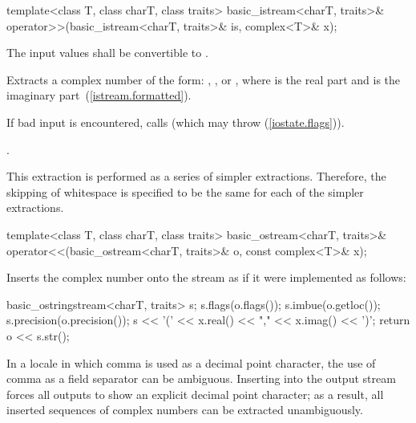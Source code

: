 %
\begin{itemdecl}
template<class T, class charT, class traits>
basic_istream<charT, traits>&
operator>>(basic_istream<charT, traits>& is, complex<T>& x);
\end{itemdecl}

\begin{itemdescr}
\pnum
\requires
The input values shall be convertible to
.

\pnum
\effects
Extracts a complex number  of the form:
,
,
or
,
where
is the real part and
is the imaginary part~(\ref{istream.formatted}).

\pnum
If bad input is encountered, calls
(which may throw
 (\ref{iostate.flags})).

\pnum
\returns
{}.

\pnum
\remarks
This extraction is performed as a series of simpler
extractions.
Therefore, the skipping of whitespace is specified to be
the same for each of the simpler extractions.
\end{itemdescr}

%
\begin{itemdecl}
template<class T, class charT, class traits>
basic_ostream<charT, traits>&
operator<<(basic_ostream<charT, traits>& o, const complex<T>& x);
\end{itemdecl}

\begin{itemdescr}
\pnum
\effects
Inserts the complex number 
onto the stream  as if it were implemented as follows:

\begin{codeblock}
basic_ostringstream<charT, traits> s;
s.flags(o.flags());
s.imbue(o.getloc());
s.precision(o.precision());
s << '(' << x.real() << "," << x.imag() << ')';
return o << s.str();
\end{codeblock}

\pnum
\begin{note}
In a locale in which comma is used as a decimal point character, the
use of comma as a field separator can be ambiguous. Inserting
 into the output stream forces all outputs to
show an explicit decimal point character; as a result, all inserted sequences of
complex numbers can be extracted unambiguously.
\end{note}
\end{itemdescr}

